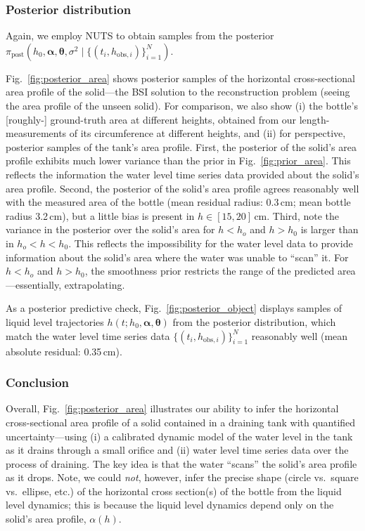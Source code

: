 \documentclass[a4paper,fleqn]{cas-dc}
\newcommand\thedata {$\{(t_i,h_{\text{obs}, i})\}_{i=1}^{N}$\xspace}
\newcommand\thedatanomath {\{(t_i,h_{\text{obs}, i})\}_{i=1}^{N}}
\newcommand\themodel {$h(t; h_0, \boldsymbol \alpha, \boldsymbol\theta)$\xspace}
\begin{document}
\subsubsection{Posterior distribution}
Again, we employ NUTS to obtain samples from the posterior $\pi_{\text{post}}(h_0, \boldsymbol \alpha, \boldsymbol \theta, \sigma^2 \mid \thedatanomath)$. 

Fig.~\ref{fig:posterior_area} shows posterior samples of the horizontal cross-sectional area profile of the solid---the BSI solution to the reconstruction problem (seeing the area profile of the unseen solid). 
For comparison, we also show (i) the bottle's [roughly-] ground-truth area at different heights, obtained from our length-measurements of its circumference at different heights, and (ii) for perspective, posterior samples of the tank's area profile. First, the posterior of the solid's area profile exhibits much lower variance than the prior in Fig.~\ref{fig:prior_area}. This reflects the information the water level time series data provided about the solid's area profile. 
Second, the posterior of the solid's area profile agrees reasonably well with the measured area of the bottle (mean residual radius: 0.3\,cm; mean bottle radius 3.2\,cm), but a little bias is present in $h\in[15, 20]$\,cm.
Third, note the variance in the posterior over the solid's area for $h<h_o$ and $h>h_0$ is larger than in $h_o < h < h_0$. This reflects the impossibility for the water level data to provide information about the solid's area where the water was unable to ``scan'' it. 
For $h<h_o$ and $h>h_0$, the smoothness prior restricts the range of the predicted area---essentially, extrapolating. 

As a posterior predictive check, Fig.~\ref{fig:posterior_object} displays samples of liquid level trajectories \themodel from the posterior distribution, which match the water level time series data \thedata reasonably well (mean absolute residual: 0.35\,cm). 

\subsubsection{Conclusion} Overall, Fig.~\ref{fig:posterior_area} illustrates our ability to infer the horizontal cross-sectional area profile of a solid contained in a draining tank with quantified uncertainty---using (i) a calibrated dynamic model of the water level in the tank as it drains through a small orifice and (ii) water level time series data over the process of draining. 
The key idea is that the water ``scans'' the solid's area profile as it drops.
Note, we could \emph{not}, however, infer the precise shape (circle vs.\ square vs.\ ellipse, etc.) of the horizontal cross section(s) of the bottle from the liquid level dynamics; this is because the liquid level dynamics depend only on the solid's area profile, $\alpha(h)$.
\end{document}
